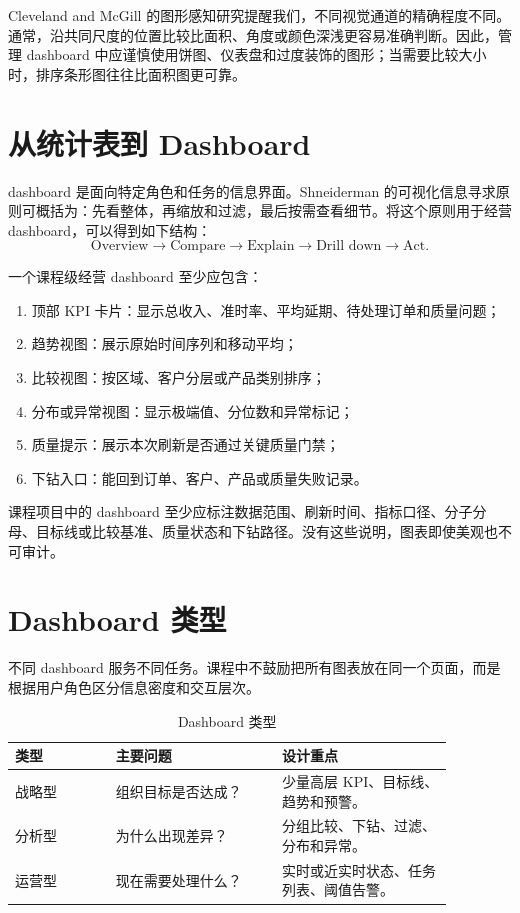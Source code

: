 \documentclass[UTF8,fontset=fandol,openany,zihao=-4]{ctexbook}
\begin{document}
Cleveland and McGill 的图形感知研究提醒我们，不同视觉通道的精确程度不同。通常，沿共同尺度的位置比较比面积、角度或颜色深浅更容易准确判断。因此，管理 dashboard 中应谨慎使用饼图、仪表盘和过度装饰的图形；当需要比较大小时，排序条形图往往比面积图更可靠。

\section{从统计表到 Dashboard}

dashboard 是面向特定角色和任务的信息界面。Shneiderman 的可视化信息寻求原则可概括为：先看整体，再缩放和过滤，最后按需查看细节。将这个原则用于经营 dashboard，可以得到如下结构：
\[
\text{Overview}
\rightarrow
\text{Compare}
\rightarrow
\text{Explain}
\rightarrow
\text{Drill down}
\rightarrow
\text{Act}.
\]

一个课程级经营 dashboard 至少应包含：
\begin{enumerate}
  \item 顶部 KPI 卡片：显示总收入、准时率、平均延期、待处理订单和质量问题；
  \item 趋势视图：展示原始时间序列和移动平均；
  \item 比较视图：按区域、客户分层或产品类别排序；
  \item 分布或异常视图：显示极端值、分位数和异常标记；
  \item 质量提示：展示本次刷新是否通过关键质量门禁；
  \item 下钻入口：能回到订单、客户、产品或质量失败记录。
\end{enumerate}

\begin{convention}
课程项目中的 dashboard 至少应标注数据范围、刷新时间、指标口径、分子分母、目标线或比较基准、质量状态和下钻路径。没有这些说明，图表即使美观也不可审计。
\end{convention}

\section{Dashboard 类型}

不同 dashboard 服务不同任务。课程中不鼓励把所有图表放在同一个页面，而是根据用户角色区分信息密度和交互层次。

\begin{table}[htbp]
\centering
\caption{Dashboard 类型}
\begin{tabular}{>{\raggedright\arraybackslash}p{0.20\linewidth}>{\raggedright\arraybackslash}p{0.33\linewidth}>{\raggedright\arraybackslash}p{0.34\linewidth}}
\toprule
类型 & 主要问题 & 设计重点\\
\midrule
战略型 & 组织目标是否达成？ & 少量高层 KPI、目标线、趋势和预警。\\
分析型 & 为什么出现差异？ & 分组比较、下钻、过滤、分布和异常。\\
运营型 & 现在需要处理什么？ & 实时或近实时状态、任务列表、阈值告警。\\
\bottomrule
\end{tabular}
\end{table}
\end{document}
